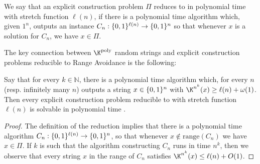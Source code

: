 \begin{definition}
We say that an explicit construction problem $\Pi$ reduces to \avoid in polynomial time with stretch function $\ell(n)$, if there is a polynomial time algorithm which, given $1^n$, outputs an \avoid instance $C_n: \{0,1\}^{\ell(n)} \to \{0,1\}^n$ so that whenever $x $ is a solution for $C_n$, we have $x \in \Pi$. 
\end{definition}
The key connection between $\K^{\poly}$ random strings and explicit construction problems reducible to Range Avoidance is the following:
\begin{observation}\label{randomstrings:obs:avoid-to-random-strings}
Say that for every $k \in \mathbb{N}$, there is a polynomial time algorithm which, for every $n$ (resp. infinitely many $n$) outputs a string $x \in \{0,1\}^n$ with $\K^{n^k}(x) \geq \ell(n) + \omega(1)$. Then every explicit construction problem reducible to \avoid with stretch function $\ell(n)$ is solvable in polynomial time .
\end{observation}
\begin{proof}
The definition of the reduction implies that there is a polynomial time algorithm $C_n: \{0,1\}^{\ell(n)} \to \{0,1\}^n$, so that whenever $x \notin \mathrm{range}(C_n)$ we have $x \in \Pi$. If $k$ is such that the algorithm constructing $C_n$ runs in time $n^k$, then we observe that every string $x$ in the range of $C_n$ satisfies $\K^{n^k}(x) \leq \ell(n) + O(1)$.
\end{proof}


